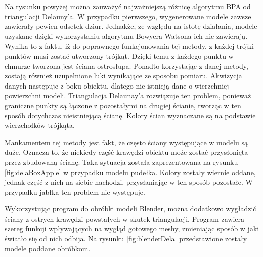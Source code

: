 Na rysunku powyżej można zauważyć najważniejszą różnicę algorytmu BPA od triangulacji Delauny'a. W przypadku pierwszego, wygenerowane modele zawsze zawierały pewien odsetek dziur. Jednakże, ze względu na istotę działania, modele uzyskane dzięki wykorzystaniu algorytmu Bowyera-Watsona ich nie zawierają. Wynika to z faktu, iż do poprawnego funkcjonowania tej metody, z każdej trójki punktów musi zostać utworzony trójkąt. Dzięki temu z każdego punktu w chmurze tworzona jest ściana ostrosłupa. Ponadto korzystając z danej metody, zostają również uzupełnione luki wynikające ze sposobu pomiaru. Akwizycja danych następuje z boku obiektu, dlatego nie istnieją dane o wierzchniej powierzchni modeli. Triangulacja Delaunay'a rozwiązuje ten problem, ponieważ graniczne punkty są łączone z pozostałymi na drugiej ścianie, tworząc w ten sposób dotychczas nieistniejącą ścianę. Kolory ścian wyznaczane są na podstawie wierzchołków trójkąta. 

Mankamentem tej metody jest fakt, że często ściany występujące w modelu są duże. Oznacza to, że niekiedy część krawędzi obiektu może zostać przysłonięta przez zbudowaną ścianę. Taka sytuacja została zaprezentowana na rysunku \ref{fig:delaBoxApple} w przypadku modelu pudełka. Kolory zostały wiernie oddane, jednak część z nich na siebie nachodzi, przysłaniając w ten sposób pozostałe. W przypadku jabłka ten problem nie występuje.

Wykorzystując program do obróbki modeli Blender, można dodatkowo wygładzić ściany z ostrych krawędzi powstałych w skutek triangulacji. Program zawiera szereg funkcji wpływających na wygląd gotowego meshy, zmieniając sposób w jaki światło się od nich odbija. Na rysunku \ref{fig:blenderDela} przedstawione zostały modele poddane obróbkom.

